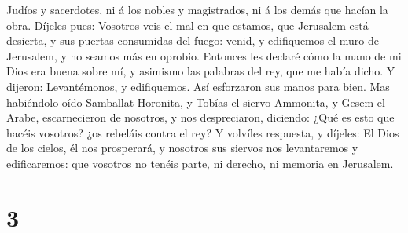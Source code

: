 Judíos y sacerdotes, ni á los nobles y magistrados, ni á los demás que
hacían la obra.  Díjeles pues: Vosotros veis el mal en
que estamos, que Jerusalem está desierta, y sus puertas consumidas del
fuego: venid, y edifiquemos el muro de Jerusalem, y no seamos más en
oprobio.  Entonces les declaré cómo la mano de mi Dios
era buena sobre mí, y asimismo las palabras del rey, que me había dicho.
Y dijeron: Levantémonos, y edifiquemos. Así esforzaron sus manos para
bien.  Mas habiéndolo oído Samballat Horonita, y Tobías
el siervo Ammonita, y Gesem el Arabe, escarnecieron de nosotros, y nos
despreciaron, diciendo: ¿Qué es esto que hacéis vosotros? ¿os rebeláis
contra el rey?  Y volvíles respuesta, y díjeles: El Dios
de los cielos, él nos prosperará, y nosotros sus siervos nos
levantaremos y edificaremos: que vosotros no tenéis parte, ni derecho,
ni memoria en Jerusalem.

\hypertarget{section-2}{%
\section{3}\label{section-2}}

